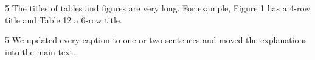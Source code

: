 \begin{reviewcomment}{5}
	The titles of tables and figures are very long. For example, Figure 1 has a 4-row title and Table 12 a 6-row title.
\end{reviewcomment}

\begin{reviewresponse}{5}
	We updated every caption to one or two sentences and moved the explanations into the main text.

\end{reviewresponse}
